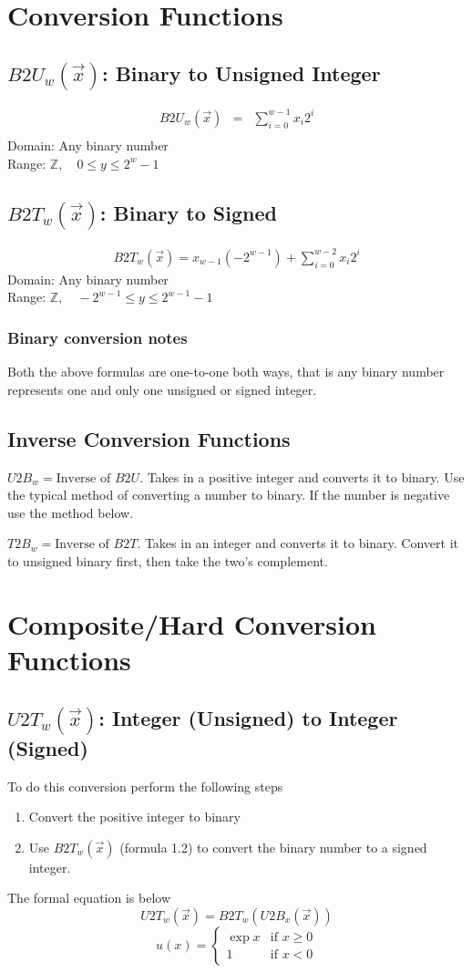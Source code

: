 \documentclass[12pt]{article}
\begin{document}
\section{Conversion Functions}
\subsection{$B2U_w(\vec{x})$: Binary to Unsigned Integer}
\begin{eqnarray*}
B2U_w(\vec{x})&=&\displaystyle \sum \limits_{i=0}^{w-1} x_{i} 2^i\\
\end{eqnarray*}
Domain: Any binary number\\
Range: $\mathbb{Z}, \quad 0\leq y \leq 2^w-1$

\subsection{$B2T_w( \vec{x} )$: Binary to Signed}
\begin{eqnarray*}
B2T_w( \vec{x} ) = x_{w-1} ({-2}^{w-1}) + \displaystyle \sum \limits_{i=0}^{w-2} x_{i} 2^i
\end{eqnarray*}
Domain: Any binary number\\
Range: $\mathbb{Z}, \quad -2^{w-1}\leq y \leq 2^{w-1}-1$

\subsubsection{Binary conversion notes}
Both the above formulas are one-to-one both ways, that is any binary number represents one and only one unsigned or signed integer.

\subsection{Inverse Conversion Functions}
$U2B_w=\text{Inverse of } B2U$. Takes in a positive integer and converts it to binary. Use the typical method of converting a number to binary. If the number is negative use the method below.

$T2B_w=\text{Inverse of } B2T$. Takes in an integer and converts it to binary. Convert it to unsigned binary first, then take the two's complement.
\newpage
\section{Composite/Hard Conversion Functions}
\subsection{$U2T_w(\vec{x})$: Integer (Unsigned) to Integer (Signed)}
To do this conversion perform the following steps
\begin{enumerate}
	\item Convert the positive integer to binary
	\item Use $B2T_w(\vec{x})$ (formula 1.2) to convert the binary number to a signed integer.
\end{enumerate}

The formal equation is below
\begin{equation}
U2T_w(\vec{x})=B2T_w(U2B_x(\vec{x}))
\end{equation}
\[
 u(x) =
  \begin{cases}
   \exp{x} & \text{if } x \geq 0 \\
   1       & \text{if } x < 0
  \end{cases}
\]
\end{document}

